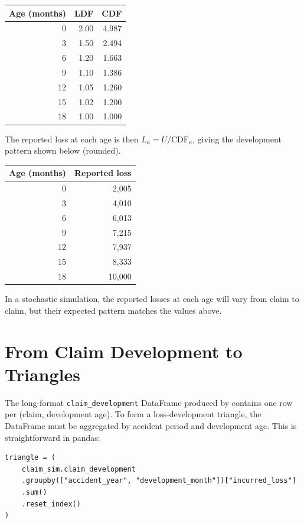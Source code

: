 \begin{center}
\begin{tabular}{rrr}
\toprule
\textbf{Age (months)} & \textbf{LDF} & \textbf{CDF} \\
\midrule
 0  & 2.00 & 4.987 \\
 3  & 1.50 & 2.494 \\
 6  & 1.20 & 1.663 \\
 9  & 1.10 & 1.386 \\
12  & 1.05 & 1.260 \\
15  & 1.02 & 1.200 \\
18  & 1.00 & 1.000 \\
\bottomrule
\end{tabular}
\end{center}

The reported loss at each age is then $L_a = U / \mathrm{CDF}_a$, giving
the development pattern shown below (rounded).

\begin{center}
\begin{tabular}{rr}
\toprule
\textbf{Age (months)} & \textbf{Reported loss} \\
\midrule
 0  & 2{,}005 \\
 3  & 4{,}010 \\
 6  & 6{,}013 \\
 9  & 7{,}215 \\
12  & 7{,}937 \\
15  & 8{,}333 \\
18  & 10{,}000 \\
\bottomrule
\end{tabular}
\end{center}

In a stochastic simulation, the reported losses at each age will vary
from claim to claim, but their expected pattern matches the values
above.

\section{From Claim Development to Triangles}

The long-format \texttt{claim\_development} DataFrame produced by
\actsim contains one row per (claim, development age). To form a
loss-development triangle, the DataFrame must be aggregated by
accident period and development age. This is straightforward in pandas:

\begin{lstlisting}[style=pythonstyle]
triangle = (
    claim_sim.claim_development
    .groupby(["accident_year", "development_month"])["incurred_loss"]
    .sum()
    .reset_index()
)
\end{lstlisting}


